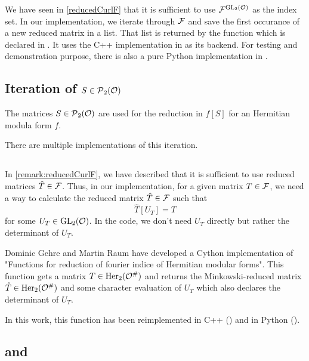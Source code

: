 We have seen in \cref{reducedCurlF} that it is sufficient to use ${\mathcal{F}}^{\operatorname{GL}_2(\mathcal{O})}$ as the index set. In our implementation, we iterate through $\mathcal{F}$ and save the first occurance of a new reduced matrix in a list. That list is returned by the function  which is declared in . It uses the C++ implementation in  as its backend. For testing and demonstration purpose, there is also a pure Python implementation  in .

\subsection{Iteration of $S \in \operatorname{\mathcal{P}}_2(\mathcal{O})$}

The matrices $S \in \operatorname{\mathcal{P}}_2(\mathcal{O})$ are used for the reduction in $f[S]$ for an Hermitian modula form $f$.

There are multiple implementations of this iteration.

\subsection{}
\label{impl:reduceGL}
In \cref{remark:reducedCurlF}, we have described that it is sufficient to use reduced matrices $\hat{T} \in \mathcal{F}$. Thus, in our implementation, for a given matrix $T \in \mathcal{F}$, we need a way to calculate the reduced matrix $\hat{T} \in \mathcal{F}$ such that
\[ \hat{T}[U_T] = T \]
for some $U_T \in \operatorname{GL}_2(\mathcal{O})$. In the code, we don't need $U_T$ directly but rather the determinant of $U_T$.

Dominic Gehre and Martin Raum have developed a Cython implementation \cite{Raum09reduceGL} of "Functions for reduction of fourier indice of Hermitian modular forms". This function  gets a matrix $T \in \operatorname{Her}_2(\mathcal{O}^\#)$ and returns the Minkowski-reduced matrix $\hat{T} \in \operatorname{Her}_2(\mathcal{O}^\#)$ and some character evaluation of $U_T$ which also declares the determinant of $U_T$.

In this work, this function  has been reimplemented in C++ () and in Python ().


\subsection{ and }

